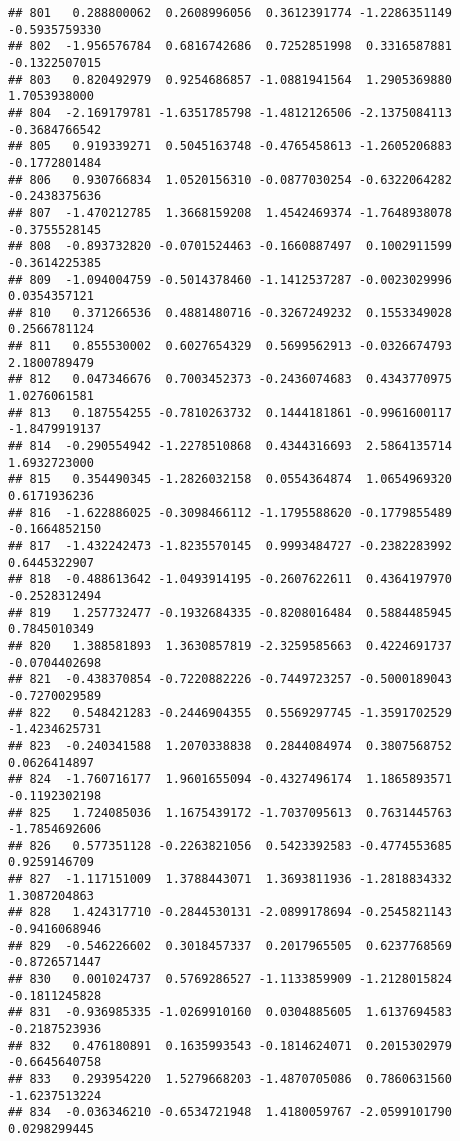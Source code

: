 \documentclass[
]{article}
\begin{document}
\begin{verbatim}
## 801   0.288800062  0.2608996056  0.3612391774 -1.2286351149 -0.5935759330
## 802  -1.956576784  0.6816742686  0.7252851998  0.3316587881 -0.1322507015
## 803   0.820492979  0.9254686857 -1.0881941564  1.2905369880  1.7053938000
## 804  -2.169179781 -1.6351785798 -1.4812126506 -2.1375084113 -0.3684766542
## 805   0.919339271  0.5045163748 -0.4765458613 -1.2605206883 -0.1772801484
## 806   0.930766834  1.0520156310 -0.0877030254 -0.6322064282 -0.2438375636
## 807  -1.470212785  1.3668159208  1.4542469374 -1.7648938078 -0.3755528145
## 808  -0.893732820 -0.0701524463 -0.1660887497  0.1002911599 -0.3614225385
## 809  -1.094004759 -0.5014378460 -1.1412537287 -0.0023029996  0.0354357121
## 810   0.371266536  0.4881480716 -0.3267249232  0.1553349028  0.2566781124
## 811   0.855530002  0.6027654329  0.5699562913 -0.0326674793  2.1800789479
## 812   0.047346676  0.7003452373 -0.2436074683  0.4343770975  1.0276061581
## 813   0.187554255 -0.7810263732  0.1444181861 -0.9961600117 -1.8479919137
## 814  -0.290554942 -1.2278510868  0.4344316693  2.5864135714  1.6932723000
## 815   0.354490345 -1.2826032158  0.0554364874  1.0654969320  0.6171936236
## 816  -1.622886025 -0.3098466112 -1.1795588620 -0.1779855489 -0.1664852150
## 817  -1.432242473 -1.8235570145  0.9993484727 -0.2382283992  0.6445322907
## 818  -0.488613642 -1.0493914195 -0.2607622611  0.4364197970 -0.2528312494
## 819   1.257732477 -0.1932684335 -0.8208016484  0.5884485945  0.7845010349
## 820   1.388581893  1.3630857819 -2.3259585663  0.4224691737 -0.0704402698
## 821  -0.438370854 -0.7220882226 -0.7449723257 -0.5000189043 -0.7270029589
## 822   0.548421283 -0.2446904355  0.5569297745 -1.3591702529 -1.4234625731
## 823  -0.240341588  1.2070338838  0.2844084974  0.3807568752  0.0626414897
## 824  -1.760716177  1.9601655094 -0.4327496174  1.1865893571 -0.1192302198
## 825   1.724085036  1.1675439172 -1.7037095613  0.7631445763 -1.7854692606
## 826   0.577351128 -0.2263821056  0.5423392583 -0.4774553685  0.9259146709
## 827  -1.117151009  1.3788443071  1.3693811936 -1.2818834332  1.3087204863
## 828   1.424317710 -0.2844530131 -2.0899178694 -0.2545821143 -0.9416068946
## 829  -0.546226602  0.3018457337  0.2017965505  0.6237768569 -0.8726571447
## 830   0.001024737  0.5769286527 -1.1133859909 -1.2128015824 -0.1811245828
## 831  -0.936985335 -1.0269910160  0.0304885605  1.6137694583 -0.2187523936
## 832   0.476180891  0.1635993543 -0.1814624071  0.2015302979 -0.6645640758
## 833   0.293954220  1.5279668203 -1.4870705086  0.7860631560 -1.6237513224
## 834  -0.036346210 -0.6534721948  1.4180059767 -2.0599101790  0.0298299445

\end{verbatim}
\end{document}
